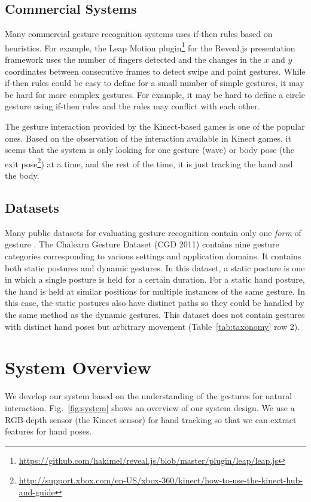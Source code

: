 \documentclass[conference]{IEEEtran}
\begin{document}
\subsection{Commercial Systems}
Many commercial gesture recognition systems uses if-then rules based on
heuristics. For example, the Leap Motion
plugin\footnote{\url{https://github.com/hakimel/reveal.js/blob/master/plugin/leap/leap.js}}
for the Reveal.js presentation framework uses the number of fingers
detected and the changes in the $x$ and $y$ coordinates between consecutive
frames to detect swipe and point gestures. While if-then rules could be easy to define for
a small number of simple gestures, it may be hard for more complex gestures.
For example, it may be hard to define a circle gesture using if-then rules and
the rules may conflict with each other.

The gesture interaction provided by the Kinect-based games is
one of the popular ones. Based on the observation of the interaction
available in Kinect games, it seems that the system is only looking for one
gesture (wave) or body pose (the exit
pose\footnote{\url{http://support.xbox.com/en-US/xbox-360/kinect/how-to-use-the-kinect-hub-and-guide}}) at a time, and the rest of the time, 
it is just tracking the hand and the body.

\subsection{Datasets}
Many public datasets for evaluating gesture recognition contain only one
\textit{form} of gesture \cite{Song11, Ruffieux2013, marcel99}. The Chalearn
Gesture Dataset (CGD 2011) \cite{guyon13} contains nine gesture categories corresponding to various settings and application domains.
 It contains both static postures and dynamic gestures. In this dataset, a static
posture is one in which a single posture is held for a certain duration. For a
static hand posture, the hand is held at similar positions for multiple
instances of the same gesture. In this case, the static postures also have
distinct paths so they could be handled by the same method as the dynamic
gestures.
This dataset does not contain gestures with distinct hand poses but arbitrary movement
(Table~\ref{tab:taxonomy} row 2).

\section{System Overview}
We develop our system based on the understanding of the gestures for
natural interaction. Fig.~\ref{fig:system} shows an overview of our system
design.
We use a RGB-depth sensor (the Kinect sensor) for hand tracking so that we can extract
features for hand poses.
\end{document}
